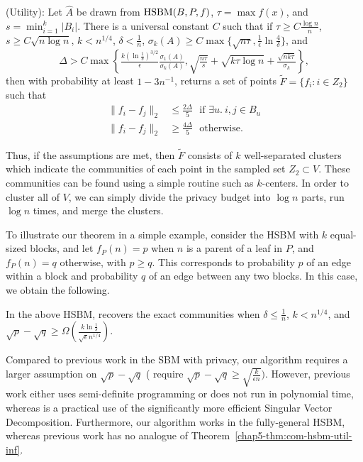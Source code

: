 \begin{thm}\label{chap5-thm:com-hsbm-util-inf}
(Utility): 
Let $\hat{A}$ be drawn from $\textnormal{HSBM}(B,P,f)$, $\tau = \max f(x)$, and $s = \min_{i=1}^k |B_i|$. There is a universal constant $C$ such that if $\tau \geq C \frac{\log n}{n}$, $s \geq C \sqrt{n \log n}$, $k < n^{1/4}$, $\delta < \frac{1}{n}$, $\sigma_k(A) \geq C \max\{ \sqrt{n\tau}, \frac{1}{\epsilon} \ln \frac{4}{\delta}\}$, and 
\[\Delta > C\max\left\{\tfrac{ k (\ln \frac{1}{\delta})^{3/2}}\epsilon \tfrac{\sigma_1(A)}{\sigma_{k}(A)},  \sqrt{\tfrac{n\tau}{s}} + \sqrt{k\tau \log n} + \tfrac{\sqrt{nk\tau}}{\sigma_k}\right\},\]
then with probability at least $1 - 3n^{-1}$, \dpcom{} returns a set of points $\tilde{F} = \{f_i : i \in Z_2\}$ such that
\begin{align*}
    \|f_{i} - f_{j}\|_2 &\leq \tfrac{2\Delta}{5}  \ \ \ \text{if $\exists u.~i,j \in B_u$} \\
    \|f_{i} - f_{j}\|_2 &\geq \tfrac{4\Delta}{5}  \ \ \ \text{otherwise}.
\end{align*}
\end{thm}
Thus, if the assumptions are met, then $\tilde{F}$ consists of $k$ well-separated clusters which indicate the communities of each point in the sampled set $Z_2 \subset V$. These communities can be found using a simple routine such as $k$-centers. In order to cluster all of $V$, we can simply divide the privacy budget into $\log n$ parts, run \dpcom{} $\log n$ times, and merge the clusters.

To illustrate our theorem in a simple example, consider the HSBM with $k$ equal-sized blocks, and let $f_P(n) = p$ when $n$ is a parent of a leaf in $P$, and $f_P(n) = q$ otherwise, with $p \geq q$. This corresponds to probability $p$ of an edge within a block and probability $q$ of an edge between any two blocks. In this case, we obtain the following.
\begin{coro}\label{chap5-cor:com-hsbm-util}
    In the above HSBM, \dpcom{} recovers the exact communities when $\delta \leq \frac{1}{n}$, $k < n^{1/4}$, and $\sqrt{p} - \sqrt{q} \geq \Omega(\frac{k \ln \frac{1}{\delta}}{\sqrt{\epsilon}n^{1/4}})$.
\end{coro}
Compared to previous work in the SBM with privacy, our algorithm requires a larger assumption on $\sqrt{p} - \sqrt{q}$ (\citet{seif2022differentially,chen2023private} require $\sqrt{p} - \sqrt{q} \geq \sqrt{\frac{k}{\epsilon n}})$. However, previous work either uses semi-definite programming or does not run in polynomial time, whereas \dpcom{} is a practical use of the significantly more efficient Singular Vector Decomposition. Furthermore, our algorithm works in the fully-general HSBM, whereas previous work has no analogue of Theorem~\ref{chap5-thm:com-hsbm-util-inf}.

